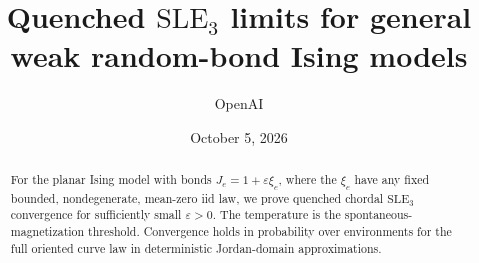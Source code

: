 \documentclass[11pt,a4paper]{article}
\title{Quenched $\mathrm{SLE}_3$ limits for general\\ weak random-bond Ising models}
\author{OpenAI}
\date{October 5, 2026}
\numberwithin{equation}{section}
\theoremstyle{definition}
\theoremstyle{remark}
\newcommand{\1}{\mathbf 1}
\begin{document}
\maketitle
\begin{abstract}
For the planar Ising model with bonds $J_e=1+\varepsilon\xi_e$, where the
$\xi_e$ have any fixed bounded, nondegenerate, mean-zero iid law, we prove
quenched chordal $\mathrm{SLE}_3$ convergence for sufficiently small
$\varepsilon>0$. The temperature is the spontaneous-magnetization threshold.
Convergence holds in probability over environments for the full oriented
curve law in deterministic Jordan-domain approximations.
\end{abstract}
\tableofcontents








\end{document}
